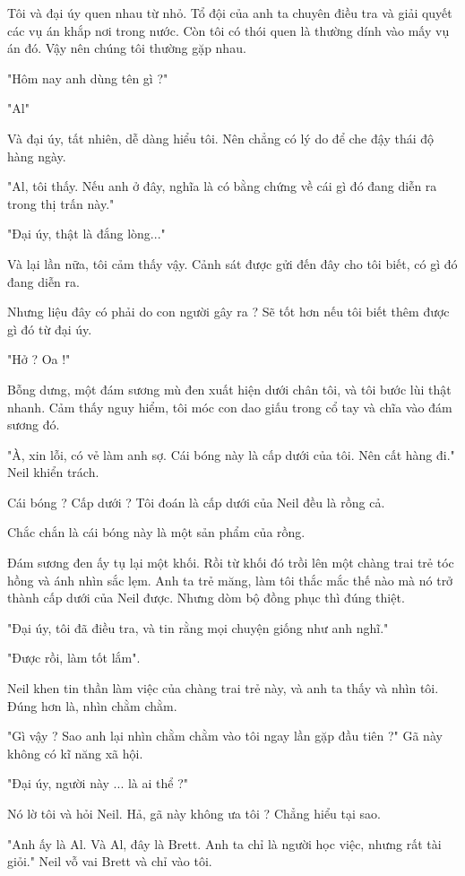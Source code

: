 Tôi và đại úy quen nhau từ nhỏ. Tổ đội của anh ta chuyên điều tra và giải quyết các vụ án khắp nơi trong nước. Còn tôi có thói quen là thường dính vào mấy vụ án đó. Vậy nên chúng tôi thường gặp nhau.

"Hôm nay anh dùng tên gì ?"

"Al"

Và đại úy, tất nhiên, dễ dàng hiểu tôi. Nên chẳng có lý do để che đậy thái độ hàng ngày.

"Al, tôi thấy. Nếu anh ở đây, nghĩa là có bằng chứng về cái gì đó đang diễn ra trong thị trấn này."

"Đại úy, thật là đắng lòng..."

Và lại lần nữa, tôi cảm thấy vậy. Cảnh sát được gửi đến đây cho tôi biết, có gì đó đang diễn ra.

Nhưng liệu đây có phải do con người gây ra ? Sẽ tốt hơn nếu tôi biết thêm được gì đó từ đại úy.

"Hở ? Oa !"

Bỗng dưng, một đám sương mù đen xuất hiện dưới chân tôi, và tôi bước lùi thật nhanh. Cảm thấy nguy hiểm, tôi móc con dao giấu trong cổ tay và chĩa vào đám sương đó.

"À, xin lỗi, có vẻ làm anh sợ. Cái bóng này là cấp dưới của tôi. Nên cất hàng đi." Neil khiển trách.

Cái bóng ? Cấp dưới ? Tôi đoán là cấp dưới của Neil đều là rồng cả.

Chắc chắn là cái bóng này là một sản phẩm của rồng. 

Đám sương đen ấy tụ lại một khối. Rồi từ khối đó trồi lên một chàng trai trẻ tóc hồng và ánh nhìn sắc lẹm. Anh ta trẻ măng, làm tôi thắc mắc thế nào mà nó trở thành cấp dưới của Neil được. Nhưng dòm bộ đồng phục thì đúng thiệt.

"Đại úy, tôi đã điều tra, và tin rằng mọi chuyện giống như anh nghĩ."

"Được rồi, làm tốt lắm".

Neil khen tin thần làm việc của chàng trai trẻ này, và anh ta thấy và nhìn tôi. Đúng hơn là, nhìn chằm chằm.

"Gì vậy ? Sao anh lại nhìn chằm chằm vào tôi ngay lần gặp đầu tiên ?" Gã này không có kĩ năng xã hội.

"Đại úy, người này ... là ai thể ?"

Nó lờ tôi và hỏi Neil. Hả, gã này không ưa tôi ? Chẳng hiểu tại sao.

"Anh ấy là Al. Và Al, đây là Brett. Anh ta chỉ là người học việc, nhưng rất tài giỏi." Neil vỗ vai Brett và chỉ vào tôi.

